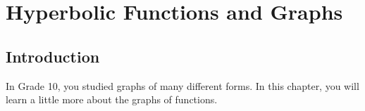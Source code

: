 \chapter{Hyperbolic Functions and Graphs}
\label{m:fg:h11}

\section{Introduction}
In Grade 10, you studied graphs of many different forms. In this chapter, you will learn a little more about the graphs of functions.



